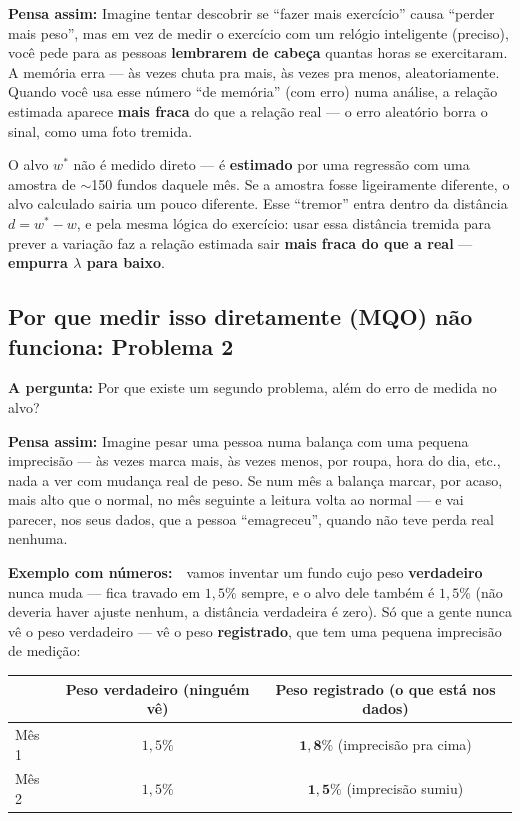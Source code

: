 \documentclass[11pt,a4paper]{article}
\newcommand{\pergunta}[1]{\par\vspace{4pt}\noindent\textbf{\color{azul}A pergunta:} #1\par\vspace{2pt}}
\newcommand{\analogia}[1]{\par\vspace{4pt}\noindent\textbf{\color{verde}Pensa assim:} #1\par\vspace{2pt}}
\newcommand{\exemplo}[0]{\par\vspace{4pt}\noindent\textbf{\color{vermelho}Exemplo com números:}\ }
\begin{document}
\analogia{Imagine tentar descobrir se ``fazer mais exercício'' causa ``perder mais peso'', mas em
vez de medir o exercício com um relógio inteligente (preciso), você pede para as pessoas
\textbf{lembrarem de cabeça} quantas horas se exercitaram. A memória erra --- às vezes chuta pra
mais, às vezes pra menos, aleatoriamente. Quando você usa esse número ``de memória'' (com erro)
numa análise, a relação estimada aparece \textbf{mais fraca} do que a relação real --- o erro
aleatório borra o sinal, como uma foto tremida.}

O alvo $w^*$ não é medido direto --- é \textbf{estimado} por uma regressão com uma amostra de
$\sim$150 fundos daquele mês. Se a amostra fosse ligeiramente diferente, o alvo calculado sairia
um pouco diferente. Esse ``tremor'' entra dentro da distância $d = w^*-w$, e pela mesma lógica do
exercício: usar essa distância tremida para prever a variação faz a relação estimada sair
\textbf{mais fraca do que a real} --- \textbf{empurra $\lambda$ para baixo}.

\subsection{Por que medir isso diretamente (MQO) não funciona: Problema 2}
\label{sec:problema2}

\pergunta{Por que existe um segundo problema, além do erro de medida no alvo?}

\analogia{Imagine pesar uma pessoa numa balança com uma pequena imprecisão --- às vezes marca
mais, às vezes menos, por roupa, hora do dia, etc., nada a ver com mudança real de peso. Se num
mês a balança marcar, por acaso, mais alto que o normal, no mês seguinte a leitura volta ao
normal --- e vai parecer, nos seus dados, que a pessoa ``emagreceu'', quando não teve perda real
nenhuma.}

\exemplo\ vamos inventar um fundo cujo peso \textbf{verdadeiro} nunca muda --- fica travado em
$1{,}5\%$ sempre, e o alvo dele também é $1{,}5\%$ (não deveria haver ajuste nenhum, a distância
verdadeira é zero). Só que a gente nunca vê o peso verdadeiro --- vê o peso \textbf{registrado},
que tem uma pequena imprecisão de medição:

\begin{center}\small
\begin{tabular}{@{}lcc@{}}
\toprule
 & Peso verdadeiro (ninguém vê) & Peso registrado (o que está nos dados) \\
\midrule
Mês 1 & $1{,}5\%$ & $\mathbf{1{,}8\%}$ (imprecisão pra cima) \\
Mês 2 & $1{,}5\%$ & $\mathbf{1{,}5\%}$ (imprecisão sumiu) \\
\bottomrule
\end{tabular}
\end{center}
\end{document}
